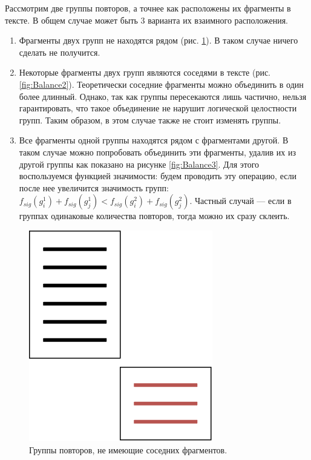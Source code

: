 \documentclass[14pt]{matmex-diploma-custom}
\begin{document}
Рассмотрим две группы повторов, а точнее как расположены их фрагменты в тексте. В общем случае может быть 3 варианта их взаимного расположения.
\begin{enumerate}
	\item Фрагменты двух групп не находятся рядом (рис. \ref{fig:Balance1}). В таком случае ничего сделать не получится.
	\item Некоторые фрагменты двух групп являются соседями в тексте (рис. \ref{fig:Balance2}). Теоретически соседние фрагменты можно объединить в один более длинный. Однако, так как группы пересекаются лишь частично, нельзя гарантировать, что такое объединение не нарушит логической целостности групп. Таким образом, в этом случае также не стоит изменять группы.
	\item Все фрагменты одной группы находятся рядом с фрагментами другой. В таком случае можно попробовать объединить эти фрагменты, удалив их из другой группы как показано на рисунке \ref{fig:Balance3}. Для этого воспользуемся функцией значимости: будем проводить эту операцию, если после нее увеличится значимость групп: $f_{sig}(g_i^1) + f_{sig}(g_j^1) < f_{sig}(g_i^2) + f_{sig}(g_j^2)$. Частный случай --- если в группах одинаковые количества повторов, тогда можно их сразу склеить.
\end{enumerate}

\begin{figure}[ht!]
	\includegraphics[scale=0.5]{pictures/Balance1.png}
	\centering
	\caption{Группы повторов, не имеющие соседних фрагментов.}
	\label{fig:Balance1}
\end{figure}
\end{document}
